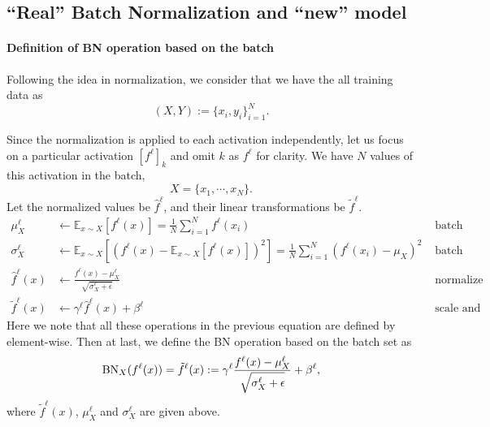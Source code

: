 \subsection{``Real'' Batch Normalization and ``new'' model}
\paragraph{Definition of BN operation based on the batch}
Following the idea in normalization, we consider that we have the all
training data as
\begin{equation}\label{eq:trainingdata}
(X,Y) := \{x_i, y_i\}_{i=1}^N.
\end{equation}

Since the normalization is applied to
each activation independently, let us focus on a particular activation $ [f^\ell]_k$ and omit $k$ as $f^\ell$ for clarity. 
We have $N$ values of this activation
in the batch,
$$ X=\{x_1, \cdots, x_N\}.$$ 
Let the normalized values be
$\hat f^\ell$, and their linear transformations be $\tilde f^\ell$. 
\begin{equation}\label{def:BNeq}
\begin{aligned}
\mu^\ell_{ X} & \leftarrow \mathbb{E}_{x \sim X} [f^\ell(x)] =  \frac{1}{N}\sum_{i=1}^N f^\ell(x_i) & \text{ batch mean}& \\
\sigma^\ell_{ X} & \leftarrow \mathbb{E}_{x \sim X}  \left[(f^\ell(x)-\mathbb{E}_{x \sim X}[ f^\ell(x)])^2 \right] = \frac{1}{N}\sum_{i=1}^N (f^\ell(x_i)-\mu_{ X})^2 &  \text{ batch variance}&\\
\hat f^\ell (x) & \leftarrow \frac{f^\ell(x)-\mu^\ell_{ X}}{\sqrt{\sigma^\ell_{ X}+\epsilon}}   &\text{ normalize}&\\
\tilde f^\ell(x)  & \leftarrow \gamma^\ell \hat f^\ell (x) + \beta^\ell 
&\text{ scale and shift}&
\end{aligned}
\end{equation}
Here we note that all these operations in the previous equation are defined by element-wise.
Then at last, we define the BN operation based on the batch set as
\begin{equation}\label{eq:BNop}
{\rm BN}_{X}({f^\ell(x)}) = \tilde f^\ell(x) := \gamma^\ell  \frac{f^\ell(x)-\mu^\ell_{ X}}{\sqrt{\sigma^\ell_{ X}+\epsilon}}  + \beta^\ell  ,
\end{equation}
where $\tilde f^\ell(x)$, $\mu^\ell_{ X}$ and $\sigma^\ell_{ X}$  are given above.

